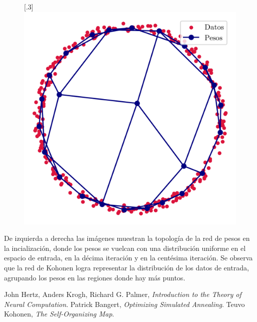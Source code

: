 \documentclass[12pt,a4paper]{article}
\begin{document}
\begin{figure}[H]
{  }
  \subcaptionbox*{}[.3\linewidth]{
    \includegraphics[width=\linewidth]{img/kohonen-topología_iteración100.png}
  }
  \centering
\end{figure}
De izquierda a derecha las imágenes muestran la topología de la red de pesos en la incialización, donde los pesos se vuelcan con una distribución uniforme en el espacio de entrada, en la décima iteración y en la centésima iteración. Se observa que la red de Kohonen logra representar la distribución de los datos de entrada, agrupando los pesos en las regiones donde hay más puntos.

\newpage
\begin{thebibliography}{9}
 John Hertz, Anders Krogh, Richard G. Palmer, \emph{Introduction to the Theory of Neural Computation}.
 Patrick Bangert, \emph{Optimizing Simulated Annealing}.
 Teuvo Kohonen, \emph{The Self-Organizing Map}.
\end{thebibliography}
\end{document}
